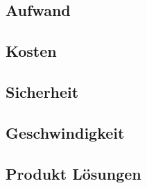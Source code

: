 \subsection{Aufwand}

\subsection{Kosten}

\subsection{Sicherheit}

\subsection{Geschwindigkeit}

\subsection{Produkt Lösungen}





